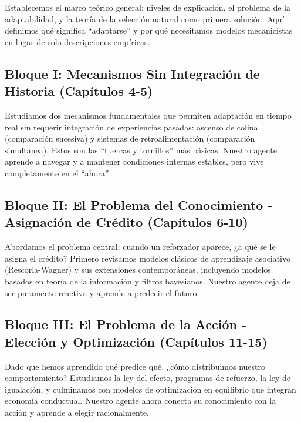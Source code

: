 \documentclass[
  letterpaper,
  DIV=11,
  numbers=noendperiod]{scrreprt}
\begin{document}
Establecemos el marco teórico general: niveles de explicación, el
problema de la adaptabilidad, y la teoría de la selección natural como
primera solución. Aquí definimos qué significa ``adaptarse'' y por qué
necesitamos modelos mecanicistas en lugar de solo descripciones
empíricas.

\subsection{Bloque I: Mecanismos Sin Integración de Historia (Capítulos
4-5)}\label{bloque-i-mecanismos-sin-integraciuxf3n-de-historia-capuxedtulos-4-5}

Estudiamos dos mecanismos fundamentales que permiten adaptación en
tiempo real sin requerir integración de experiencias pasadas: ascenso de
colina (comparación sucesiva) y sistemas de retroalimentación
(comparación simultánea). Estos son las ``tuercas y tornillos'' más
básicas. Nuestro agente aprende a navegar y a mantener condiciones
internas estables, pero vive completamente en el ``ahora''.

\subsection{Bloque II: El Problema del Conocimiento - Asignación de
Crédito (Capítulos
6-10)}\label{bloque-ii-el-problema-del-conocimiento---asignaciuxf3n-de-cruxe9dito-capuxedtulos-6-10}

Abordamos el problema central: cuando un reforzador aparece, ¿a qué se
le asigna el crédito? Primero revisamos modelos clásicos de aprendizaje
asociativo (Rescorla-Wagner) y sus extensiones contemporáneas,
incluyendo modelos basados en teoría de la información y filtros
bayesianos. Nuestro agente deja de ser puramente reactivo y aprende a
predecir el futuro.

\subsection{Bloque III: El Problema de la Acción - Elección y
Optimización (Capítulos
11-15)}\label{bloque-iii-el-problema-de-la-acciuxf3n---elecciuxf3n-y-optimizaciuxf3n-capuxedtulos-11-15}

Dado que hemos aprendido qué predice qué, ¿cómo distribuimos nuestro
comportamiento? Estudiamos la ley del efecto, programas de refuerzo, la
ley de igualación, y culminamos con modelos de optimización en
equilibrio que integran economía conductual. Nuestro agente ahora
conecta su conocimiento con la acción y aprende a elegir racionalmente.
\end{document}
